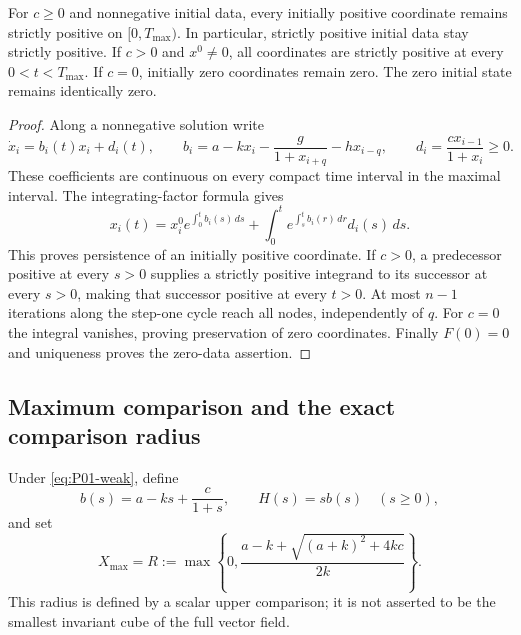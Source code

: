 \begin{proposition}
\label{prop:P01-positive}
For $c\ge0$ and nonnegative initial data, every initially positive
coordinate remains strictly positive on $[0,T_{\max})$. In particular,
strictly positive initial data stay strictly positive. If $c>0$ and
$x^0\ne0$, all coordinates are strictly positive at every
$0<t<T_{\max}$. If $c=0$, initially zero coordinates remain zero.
The zero initial state remains identically zero.
\end{proposition}
\begin{proof}
Along a nonnegative solution write
\[
 \dot x_i=b_i(t)x_i+d_i(t),\qquad
 b_i=a-kx_i-\frac{g}{1+x_{i+q}}-h x_{i-q},\qquad
 d_i=\frac{c x_{i-1}}{1+x_i}\ge0.
\]
These coefficients are continuous on every compact time interval in
the maximal interval. The integrating-factor formula gives
\begin{equation}
\label{eq:P01-positive}
 x_i(t)=x_i^0 e^{\int_0^t b_i(s)\,ds}
       +\int_0^t e^{\int_s^t b_i(r)\,dr}d_i(s)\,ds.
\end{equation}
This proves persistence of an initially positive coordinate.
If $c>0$, a predecessor positive at every $s>0$ supplies a strictly
positive integrand to its successor at every $s>0$, making that successor
positive at every $t>0$. At most $n-1$ iterations along the step-one
cycle reach all nodes, independently of $q$. For $c=0$ the integral
vanishes, proving preservation of zero coordinates. Finally $F(0)=0$
and uniqueness proves the zero-data assertion.
\end{proof}

\subsection{Maximum comparison and the exact comparison radius}
\label{slot:P01-2}
Under \eqref{eq:P01-weak}, define
\[
 b(s)=a-ks+\frac{c}{1+s},\qquad H(s)=s b(s)\quad(s\ge0),
\]
and set
\begin{equation}
\label{eq:P01-radius}
 X_{\max}=R:=\max\left\{0,\frac{a-k+\sqrt{(a+k)^2+4kc}}{2k}\right\}.
\end{equation}
This radius is defined by a scalar upper comparison; it is not asserted
to be the smallest invariant cube of the full vector field.

